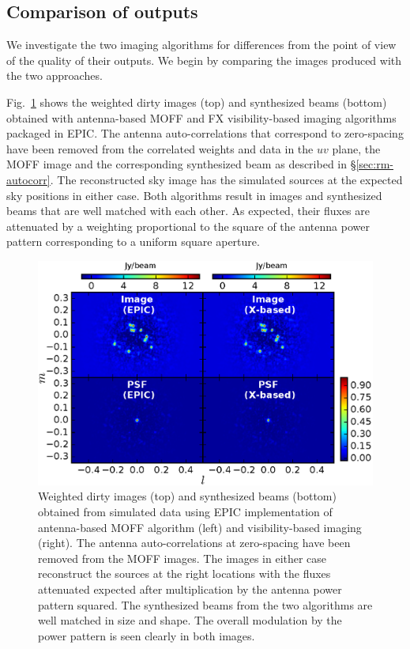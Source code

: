 \documentclass[a4paper,fleqn,usenatbib]{mnras}
\begin{document}
\subsection{Comparison of outputs}\label{sec:diff}

We investigate the two imaging algorithms for differences from the point of view of the quality of their outputs. We begin by comparing the images produced with the two approaches. 

Fig.~\ref{fig:MOFF-FX-image} shows the weighted dirty images (top) and synthesized beams (bottom) obtained with antenna-based MOFF and FX visibility-based imaging algorithms packaged in EPIC. The antenna auto-correlations that correspond to zero-spacing have been removed from the correlated weights and data in the $uv$ plane, the MOFF image and the corresponding synthesized beam as described in \S\ref{sec:rm-autocorr}. The reconstructed sky image has the simulated sources at the expected sky positions in either case. Both algorithms result in images and synthesized beams that are well matched with each other. As expected, their fluxes are attenuated by a weighting proportional to the square of the antenna power pattern corresponding to a uniform square aperture.

\begin{figure}
  \includegraphics[width=\columnwidth]{figure5}
  \caption{Weighted dirty images (top) and synthesized beams (bottom) obtained from simulated data using EPIC implementation of antenna-based MOFF algorithm (left) and visibility-based imaging (right). The antenna auto-correlations at zero-spacing have been removed from the MOFF images. The images in either case reconstruct the sources at the right locations with the fluxes attenuated expected after multiplication by the antenna power pattern squared. The synthesized beams from the two algorithms are well matched in size and shape. The overall modulation by the power pattern is seen clearly in both images.}
  \label{fig:MOFF-FX-image}
\end{figure}
\end{document}
